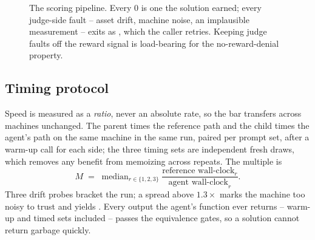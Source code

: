 \documentclass[11pt]{article}
\newcommand{\pc}[1]{\texttt{\detokenize{#1}}}
\begin{document}
\begin{figure}[t]
\centering
{}
\caption{The scoring pipeline. Every $0$ is one the solution earned; every judge-side
fault -- asset drift, machine noise, an implausible measurement -- exits as
\pc{INVALID_RUN}, which the caller retries. Keeping judge faults off the reward signal
is load-bearing for the no-reward-denial property.}
\label{fig:pipeline}
\end{figure}



\subsection{Timing protocol}
\label{sec:timing}

Speed is measured as a \emph{ratio}, never an absolute rate, so the bar transfers
across machines unchanged. The parent times the reference path and the child times the
agent's path on the same machine in the same run, paired per prompt set, after a
warm-up call for each side; the three timing sets are independent fresh draws, which
removes any benefit from memoizing across repeats. The multiple is
\[
M \;=\; \operatorname{median}_{r \in \{1,2,3\}}
        \frac{\text{reference wall-clock}_r}{\text{agent wall-clock}_r}.
\]
Three drift probes bracket the run; a spread above $1.3\times$ marks the machine too
noisy to trust and yields \pc{INVALID_RUN}. Every output the agent's function ever
returns -- warm-up and timed sets included -- passes the equivalence gates, so a
solution cannot return garbage quickly.
\end{document}

